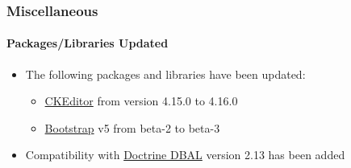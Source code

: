 %

\begin{frame}[fragile]
	\frametitle{Miscellaneous}
	\framesubtitle{Packages/Libraries Updated}

	\begin{itemize}
		\item The following packages and libraries have been updated:
		\begin{itemize}
			\item \href{https://ckeditor.com/}{CKEditor} from version 4.15.0 to 4.16.0
			\item \href{https://getbootstrap.com/}{Bootstrap} v5 from beta-2 to beta-3
		\end{itemize}
		\item Compatibility with
			\href{https://www.doctrine-project.org/projects/dbal.html}{Doctrine DBAL}
			version 2.13 has been added
	\end{itemize}

\end{frame}

